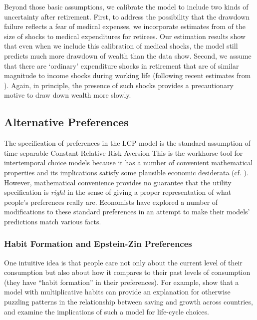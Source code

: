 \documentclass{article}
\begin{document}
Beyond those basic assumptions, we calibrate the model to include two kinds of uncertainty after retirement.
First, to address the possibility that the drawdown failure reflects a fear of medical expenses, we incorporate estimates from \cite{velasquezgiraldoJMP} of the size of shocks to medical expenditures for retirees.
Our estimation results show that even when we include this calibration of medical shocks, the model still predicts much more drawdown of wealth than the data show.
Second, we assume that there are `ordinary' expenditure shocks in retirement that are of similar magnitude to income shocks during working life (following recent estimates from  \cite{flExpShocks}).
Again, in principle, the presence of such shocks provides a precautionary motive to draw down wealth more slowly.

\subsection{Alternative Preferences}

The specification of preferences in the LCP model is the standard assumption of time-separable Constant Relative Risk Aversion
This is the workhorse tool for intertemporal choice models because it has a number of convenient mathematical properties and its implications satisfy some plausible economic desiderata (cf. \cite{kimballStandardRA}).
However, mathematical convenience provides no guarantee that the utility specification is \textit{right} in the sense of giving a proper representation of what people's preferences really are.
Economists have explored a number of modifications to these standard preferences in an attempt to make their models' predictions match various facts.

\subsubsection{Habit Formation and Epstein-Zin Preferences}

One intuitive idea is that people care not only about the current level of their consumption but also about how it compares to their past levels of consumption (they have ``habit formation'' in their preferences).
For example, \cite{Carroll_2000} show that a model with multiplicative habits can provide an explanation for otherwise puzzling patterns in the relationship between saving and growth across countries, and
\cite{Michaelides_2002} examine the implications of such a model for life-cycle choices.
\end{document}
